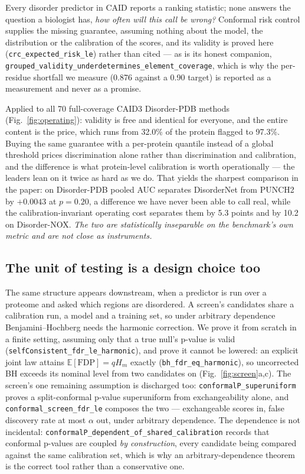 \documentclass[11pt,a4paper]{article}
\newcommand{\code}[1]{\texttt{\small #1}}
\begin{document}
Every disorder predictor in CAID reports a ranking statistic; none answers the
question a biologist has, \emph{how often will this call be wrong?} Conformal
risk control supplies the missing guarantee, assuming nothing about the model,
the distribution or the calibration of the scores, and its validity is proved
here (\code{crc\_expected\_risk\_le}) rather than cited --- as is its honest
companion, \code{grouped\_validity\_underdetermines\_element\_coverage}, which is
why the per-residue shortfall we measure (0.876 against a 0.90 target) is
reported as a measurement and never as a promise.

Applied to all 70 full-coverage CAID3 Disorder-PDB methods
(Fig.~\ref{fig:operating}): validity is free and identical for everyone, and the
entire content is the price, which runs from 32.0\% of the protein flagged to
97.3\%. Buying the same guarantee with a per-protein quantile instead of a global
threshold prices discrimination alone rather than discrimination and
calibration, and the difference is what protein-level calibration is worth
operationally --- the leaders lean on it twice as hard as we do. That yields the
sharpest comparison in the paper: on Disorder-PDB pooled AUC separates
DisorderNet from PUNCH2 by $+0.0043$ at $p = 0.20$, a difference we have never
been able to call real, while the calibration-invariant operating cost separates
them by 5.3 points and by 10.2 on Disorder-NOX. \emph{The two are statistically
inseparable on the benchmark's own metric and are not close as instruments.}

\subsection*{The unit of testing is a design choice too}

The same structure appears downstream, when a predictor is run over a proteome
and asked which regions are disordered. A screen's candidates share a calibration
run, a model and a training set, so under arbitrary dependence
Benjamini--Hochberg\cite{bh} needs the harmonic correction\cite{by}. We prove it
from scratch in a finite setting, assuming only that a true null's p-value is
valid (\code{selfConsistent\_fdr\_le\_harmonic}), and prove it cannot be
lowered: an explicit joint law attains $\mathbb{E}[\mathrm{FDP}] = qH_m$ exactly
(\code{bh\_fdr\_eq\_harmonic}), so uncorrected BH exceeds its nominal level from
two candidates on (Fig.~\ref{fig:screen}a,c). The screen's one remaining
assumption is discharged too: \code{conformalP\_superuniform} proves a
split-conformal p-value superuniform from exchangeability alone, and
\code{conformal\_screen\_fdr\_le} composes the two --- exchangeable scores in,
false discovery rate at most $\alpha$ out, under arbitrary dependence. The
dependence is not incidental:
\code{conformalP\_dependent\_of\_shared\_calibration} records that conformal
p-values are coupled \emph{by construction}, every candidate being compared
against the same calibration set, which is why an arbitrary-dependence theorem
is the correct tool rather than a conservative one.
\end{document}
